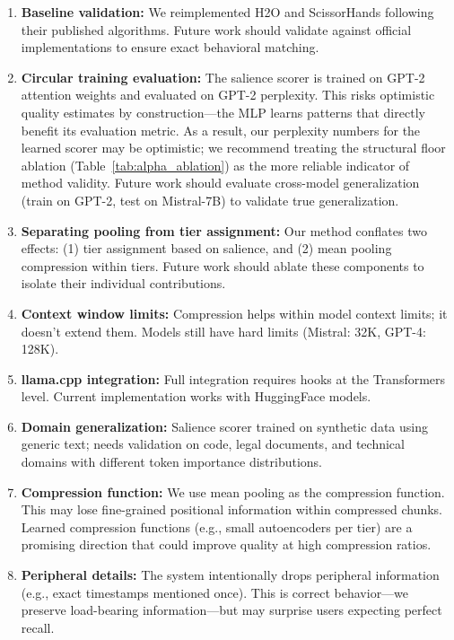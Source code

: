\documentclass[11pt]{article}
\begin{document}
\begin{enumerate}
\item \textbf{Baseline validation:} We reimplemented H2O and ScissorHands following their published algorithms. Future work should validate against official implementations to ensure exact behavioral matching.
\item \textbf{Circular training evaluation:} The salience scorer is trained on GPT-2 attention weights and evaluated on GPT-2 perplexity. This risks optimistic quality estimates by construction---the MLP learns patterns that directly benefit its evaluation metric. As a result, our perplexity numbers for the learned scorer may be optimistic; we recommend treating the structural floor ablation (Table~\ref{tab:alpha_ablation}) as the more reliable indicator of method validity. Future work should evaluate cross-model generalization (train on GPT-2, test on Mistral-7B) to validate true generalization.
\item \textbf{Separating pooling from tier assignment:} Our method conflates two effects: (1) tier assignment based on salience, and (2) mean pooling compression within tiers. Future work should ablate these components to isolate their individual contributions.
\item \textbf{Context window limits:} Compression helps within model context limits; it doesn't extend them. Models still have hard limits (Mistral: 32K, GPT-4: 128K).
\item \textbf{llama.cpp integration:} Full integration requires hooks at the Transformers level. Current implementation works with HuggingFace models.
\item \textbf{Domain generalization:} Salience scorer trained on synthetic data using generic text; needs validation on code, legal documents, and technical domains with different token importance distributions.
\item \textbf{Compression function:} We use mean pooling as the compression function. This may lose fine-grained positional information within compressed chunks. Learned compression functions (e.g., small autoencoders per tier) are a promising direction that could improve quality at high compression ratios.
\item \textbf{Peripheral details:} The system intentionally drops peripheral information (e.g., exact timestamps mentioned once). This is correct behavior---we preserve load-bearing information---but may surprise users expecting perfect recall.
\end{enumerate}
\end{document}
